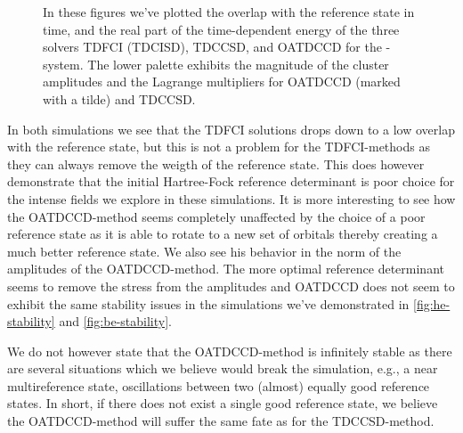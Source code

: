 \begin{figure}
            \caption{In these figures we've plotted the overlap with the
            reference state in time, and the real part of the time-dependent
            energy of the three solvers TDFCI (TDCISD), TDCCSD, and OATDCCD for
            the -system.
            The lower palette exhibits the magnitude of the cluster amplitudes
            and the Lagrange multipliers for OATDCCD (marked with a tilde) and
            TDCCSD.}
            \label{fig:be-stability}
        \end{figure}
        In both simulations we see that the TDFCI solutions drops down to a low
        overlap with the reference state, but this is not a problem for the
        TDFCI-methods as they can always remove the weigth of the reference
        state.
        This does however demonstrate that the initial Hartree-Fock reference
        determinant is poor choice for the intense fields we explore in these
        simulations.
        It is more interesting to see how the OATDCCD-method seems completely
        unaffected by the choice of a poor reference state as it is able to
        rotate to a new set of orbitals thereby creating a much better reference
        state.
        We also see his behavior in the norm of the amplitudes of the
        OATDCCD-method.
        The more optimal reference determinant seems to remove the stress from
        the amplitudes and OATDCCD does not seem to exhibit the same stability
        issues in the simulations we've demonstrated in
        \autoref{fig:he-stability} and \autoref{fig:be-stability}.

        We do not however state that the OATDCCD-method is infinitely stable as
        there are several situations which we believe would break the
        simulation, e.g., a near multireference state, oscillations between two
        (almost) equally good reference states.
        In short, if there does not exist a single good reference state, we
        believe the OATDCCD-method will suffer the same fate as for the
        TDCCSD-method.


